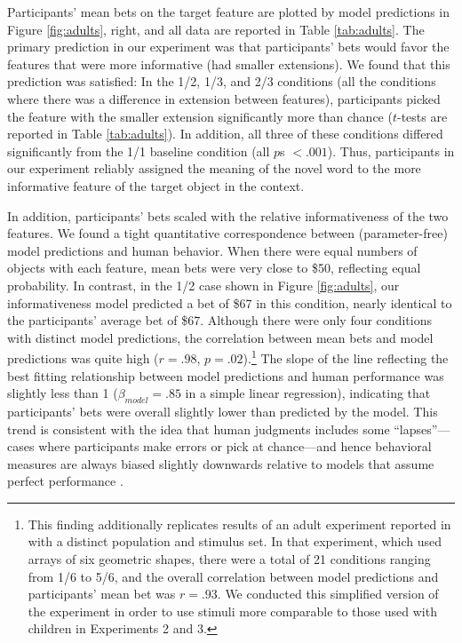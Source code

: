 \documentclass[review]{elsarticle}
\begin{document}
Participants' mean bets on the target feature are plotted by model predictions in Figure \ref{fig:adults}, right, and all data are reported in Table \ref{tab:adults}. The primary prediction in our experiment was that participants' bets would favor the features that were more informative (had smaller extensions). We found that this prediction was satisfied: In the 1/2, 1/3, and 2/3 conditions (all the conditions where there was a difference in extension between features), participants picked the feature with the smaller extension significantly more than chance ($t$-tests are reported in Table \ref{tab:adults}). In addition, all three of these conditions differed significantly from the 1/1 baseline condition (all $p$s $< .001$). Thus, participants in our experiment reliably assigned the meaning of the novel word to the more informative feature of the target object in the context. 

In addition, participants' bets scaled with the relative informativeness of the two features. We found a tight quantitative correspondence between (parameter-free) model predictions and human behavior. When there were equal numbers of objects with each feature, mean bets were very close to \$50, reflecting equal probability. In contrast, in the 1/2 case shown in Figure \ref{fig:adults}, our informativeness model predicted a bet of \$67 in this condition, nearly identical to the participants' average bet of \$67. Although there were only four conditions with distinct model predictions, the correlation between mean bets and model predictions was quite high ($r = .98$, $p = .02$).\footnote{This finding additionally replicates results of an adult experiment reported in \citet{frank2009b} with a distinct population and stimulus set. In that experiment, which used arrays of six geometric shapes, there were a total of 21 conditions ranging from 1/6 to 5/6, and the overall correlation between model predictions and participants' mean bet was $r=.93$. We conducted this simplified version of the experiment in order to use stimuli more comparable to those used with children in Experiments 2 and 3.} The slope of the line reflecting the best fitting relationship between model predictions and human performance was slightly less than 1 ($\beta_{model} = .85$ in a simple linear regression), indicating that participants' bets were overall slightly lower than predicted by the model. This trend is consistent with the idea that human judgments includes some ``lapses''---cases where participants make errors or pick at chance---and hence behavioral measures are always biased slightly downwards relative to models that assume perfect performance \citep{wichmann2001,frank2010}. 
\end{document}
